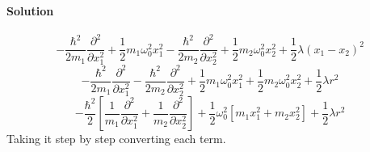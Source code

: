 \documentclass{article}
\begin{document}
{\begin{enumerate}
		\paragraph{Solution}
		\[
			-\frac{\hbar^2}{2m_1} \frac{\partial^2}{\partial x_1^2} + \frac{1}{2} m_1 \omega^2_0 x_1^2 - \frac{\hbar^2}{2m_2} \frac{\partial^2}{\partial x_2^2} + \frac{1}{2} m_2 \omega^2_0 x_2^2 + \frac{1}{2} \lambda (x_1 - x_2)^2
		\]
		\[
			-\frac{\hbar^2}{2m_1} \frac{\partial^2}{\partial x_1^2} - \frac{\hbar^2}{2m_2} \frac{\partial^2}{\partial x_2^2} + \frac{1}{2} m_1 \omega^2_0 x_1^2 + \frac{1}{2} m_2 \omega^2_0 x_2^2 + \frac{1}{2} \lambda r^2
		\]
		\[
			-\frac{\hbar^2}{2} \left[ \frac{1}{m_1} \frac{\partial^2}{\partial x_1^2} + \frac{1}{m_2} \frac{\partial^2}{\partial x_2^2} \right] + \frac{1}{2} \omega^2_0 \left[m_1 x_1^2 + m_2 x_2^2\right] + \frac{1}{2} \lambda r^2
		\]
		Taking it step by step converting each term.

\end{enumerate}}
\end{document}
